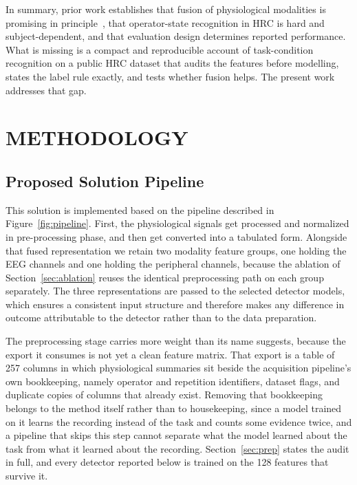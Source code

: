 \documentclass[a4paper,twoside]{article}
\begin{document}
In summary, prior work establishes that fusion of physiological modalities is promising in principle~\cite{baltrusaitis2019multimodal,cheng2025crosssubject}, that operator-state recognition in \ac{HRC} is hard and subject-dependent, and that evaluation design determines reported performance. What is missing is a compact and reproducible account of task-condition recognition on a public \ac{HRC} dataset that audits the features before modelling, states the label rule exactly, and tests whether fusion helps. The present work addresses that gap.

\section{\uppercase{Methodology}}\label{sec:method}

\subsection{Proposed Solution Pipeline}

\noindent This solution is implemented based on the pipeline described in Figure~\ref{fig:pipeline}. First, the physiological signals get processed and normalized in pre-processing phase, and then get converted into a tabulated form. Alongside that fused representation we retain two modality feature groups, one holding the \ac{EEG} channels and one holding the peripheral channels, because the ablation of Section~\ref{sec:ablation} reuses the identical preprocessing path on each group separately. The three representations are passed to the selected detector models, which ensures a consistent input structure and therefore makes any difference in outcome attributable to the detector rather than to the data preparation.

The preprocessing stage carries more weight than its name suggests, because the export it consumes is not yet a clean feature matrix. That export is a table of 257 columns in which physiological summaries sit beside the acquisition pipeline's own bookkeeping, namely operator and repetition identifiers, dataset flags, and duplicate copies of columns that already exist. Removing that bookkeeping belongs to the method itself rather than to housekeeping, since a model trained on it learns the recording instead of the task and counts some evidence twice, and a pipeline that skips this step cannot separate what the model learned about the task from what it learned about the recording. Section~\ref{sec:prep} states the audit in full, and every detector reported below is trained on the 128 features that survive it.
\end{document}
